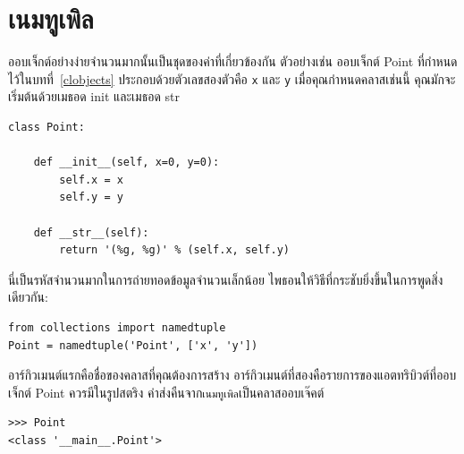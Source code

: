 \section{เนมทูเพิล} %


ออบเจ็กต์อย่างง่ายจำนวนมากนั้นเป็นชุดของค่าที่เกี่ยวข้องกัน ตัวอย่างเช่น ออบเจ็กต์ Point 
ที่กำหนดไว้ในบทที่~\ref{clobjects} ประกอบด้วยตัวเลขสองตัวคือ {\tt x} และ {\tt y} เมื่อคุณกำหนดคลาสเช่นนี้ คุณมักจะเริ่มต้นด้วยเมธอด init และเมธอด str


\begin{verbatim}
class Point:

    def __init__(self, x=0, y=0):
        self.x = x
        self.y = y

    def __str__(self):
        return '(%g, %g)' % (self.x, self.y)
\end{verbatim}

นี่เป็นรหัสจำนวนมากในการถ่ายทอดข้อมูลจำนวนเล็กน้อย ไพธอนให้วิธีที่กระชับยิ่งขึ้นในการพูดสิ่งเดียวกัน:

\begin{verbatim}
from collections import namedtuple
Point = namedtuple('Point', ['x', 'y'])
\end{verbatim}

อาร์กิวเมนต์แรกคือชื่อของคลาสที่คุณต้องการสร้าง อาร์กิวเมนต์ที่สองคือรายการของแอตทริบิวต์ที่ออบเจ็กต์ Point ควรมีในรูปสตริง ค่าส่งคืนจาก{\tt เนมทูเพิล}เป็นคลาสออบเจ๊คต์


\begin{verbatim}
>>> Point
<class '__main__.Point'>
\end{verbatim}

